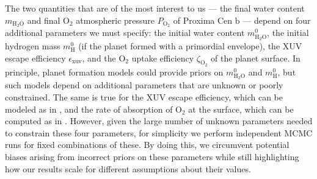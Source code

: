 \documentclass[preprint,12pt]{aastex}
\begin{document}
The two quantities that are of the most interest to us --- the final water content $m_\mathrm{H_2O}$ and final O$_2$ atmospheric 
pressure $P_\mathrm{O_2}$ of Proxima Cen b --- depend on four additional parameters we must specify: the initial water content $m_\mathrm{H_2O}^0$, the initial hydrogen 
mass $m_\mathrm{H}^0$ (if the planet formed with a primordial envelope), the XUV escape efficiency $\epsilon_\mathrm{xuv}$, and
the O$_2$ uptake efficiency $\zeta_\mathrm{O_2}$ of the planet surface. In principle, planet formation models could provide
priors on $m_\mathrm{H_2O}^0$ and $m_\mathrm{H}^0$, but such models depend on additional parameters that are unknown or poorly 
constrained. The same is true for the XUV escape efficiency, which can be modeled as in \cite{Ribas16}, and the rate of
absorption of O$_2$ at the surface, which can be computed as in \cite{Schaefer16}. However, given the large number of unknown
parameters needed to constrain these four parameters, for simplicity we perform independent MCMC runs for fixed combinations
of these. By doing this, we circumvent potential biases arising from incorrect priors on these parameters while still
highlighting how our results scale for different assumptions about their values.
\end{document}
